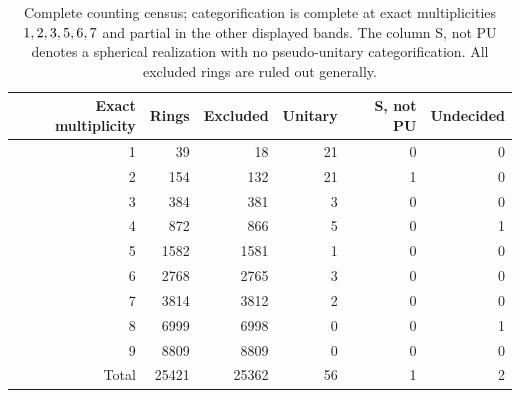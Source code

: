 \begin{table}[ht]\centering\small
\begin{tabular}{rrrrrr}\toprule
Exact multiplicity & Rings & Excluded & Unitary & S, not PU & Undecided\\\midrule
1 & 39 & 18 & 21 & 0 & 0\\
2 & 154 & 132 & 21 & 1 & 0\\
3 & 384 & 381 & 3 & 0 & 0\\
4 & 872 & 866 & 5 & 0 & 1\\
5 & 1582 & 1581 & 1 & 0 & 0\\
6 & 2768 & 2765 & 3 & 0 & 0\\
7 & 3814 & 3812 & 2 & 0 & 0\\
8 & 6999 & 6998 & 0 & 0 & 1\\
9 & 8809 & 8809 & 0 & 0 & 0\\
\midrule
Total & 25421 & 25362 & 56 & 1 & 2\\
\bottomrule\end{tabular}
\caption{Complete counting census; categorification is complete at exact multiplicities $1, 2, 3, 5, 6, 7$ and partial in the other displayed bands. The column S, not PU denotes a spherical realization with no pseudo-unitary categorification. All excluded rings are ruled out generally.}\label{tab:classification}
\end{table}
